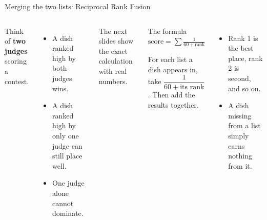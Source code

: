 \documentclass[aspectratio=169,11pt]{beamer}
\newcommand{\key}[1]{\textcolor{ember}{\textbf{#1}}}
\begin{document}
\begin{frame}{Merging the two lists: Reciprocal Rank Fusion}
  \begin{columns}[T]
      Think of \key{two judges} scoring a contest.
      \begin{itemize}
        \item A dish ranked high by \alert{both} judges wins.
        \item A dish ranked high by only one judge can still place well.
        \item One judge alone cannot dominate.
      \end{itemize}
      \vspace{0.2cm}
      {\small The next slides show the exact calculation with real numbers.}
      \begin{block}{The formula}
        \centering
        \Large $\displaystyle \text{score} = \sum \frac{1}{60 + \text{rank}}$

        \vspace{0.2cm}
        \footnotesize
        For each list a dish appears in, take $\dfrac{1}{60 + \text{its rank}}$. Then add the results together.
      \end{block}
      \begin{itemize}\small
        \item Rank 1 is the best place, rank 2 is second, and so on.
        \item A dish missing from a list simply earns nothing from it.
      \end{itemize}
  \end{columns}
\end{frame}
\end{document}
